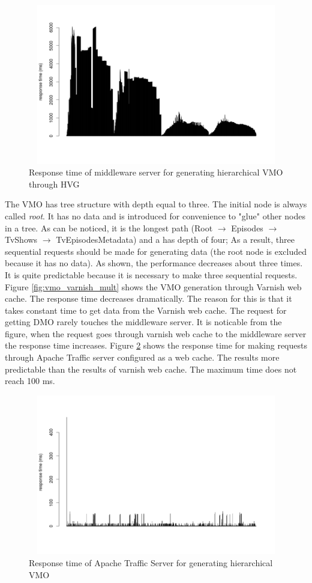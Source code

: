 \begin{figure}[h!]
    \centering
    \includegraphics[width=15cm,height=7cm,keepaspectratio]{images/vmo_hvg.png}
    \caption{Response time of middleware server for generating hierarchical VMO through HVG}
    \label{fig:vmo_hvg}
\end{figure}


The VMO has tree structure with depth equal to three. The initial node is always called \textit{root}. It has no data and is introduced for convenience to "glue" other nodes in a tree. As can be noticed, it is the longest path (Root $\rightarrow$ Episodes $\rightarrow$ TvShows $\rightarrow$ TvEpisodesMetadata) and a has depth of four; As a result, three sequential requests should be made for generating data (the root node is excluded because it has no data). As shown, the performance decreases about three times. It is quite predictable because it is necessary to make three sequential requests. Figure \ref{fig:vmo_varnish_mult} shows the VMO generation through Varnish web cache. The response time decreases dramatically. The reason for this is that it takes constant time to get data from the Varnish web cache. The request for getting DMO rarely touches the middleware server. It is noticable from the figure, when the request goes through varnish web cache to the middleware server the response time increases. Figure \ref{fig:vmo_ts_mult} shows the response time for making requests through Apache Traffic server configured as a web cache. The results more predictable than the results of varnish web cache. The maximum time does not reach 100 ms.  

\begin{figure}[h!]
    \centering
    \includegraphics[width=15cm,height=7cm,keepaspectratio]{images/vmo_ts_mult.png}
    \caption{Response time of Apache Traffic Server for generating hierarchical VMO}
    \label{fig:vmo_ts_mult}
\end{figure}

